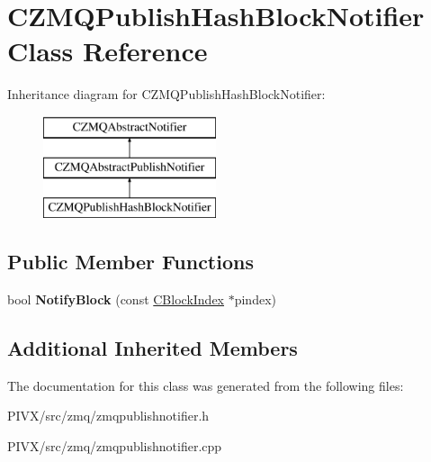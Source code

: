 \hypertarget{class_c_z_m_q_publish_hash_block_notifier}{}\section{C\+Z\+M\+Q\+Publish\+Hash\+Block\+Notifier Class Reference}
\label{class_c_z_m_q_publish_hash_block_notifier}
Inheritance diagram for C\+Z\+M\+Q\+Publish\+Hash\+Block\+Notifier\+:\begin{figure}[H]
\begin{center}
\leavevmode
\includegraphics[height=3.000000cm]{class_c_z_m_q_publish_hash_block_notifier}
\end{center}
\end{figure}
\subsection*{Public Member Functions}
\begin{DoxyCompactItemize}
\item 
\mbox{\label{class_c_z_m_q_publish_hash_block_notifier_ac40147fa0fcbbd7ab755b599b0a9c900}} 
bool {\bfseries Notify\+Block} (const \mbox{\hyperlink{class_c_block_index}{C\+Block\+Index}} $\ast$pindex)
\end{DoxyCompactItemize}
\subsection*{Additional Inherited Members}


The documentation for this class was generated from the following files\+:\begin{DoxyCompactItemize}
\item 
P\+I\+V\+X/src/zmq/zmqpublishnotifier.\+h\item 
P\+I\+V\+X/src/zmq/zmqpublishnotifier.\+cpp\end{DoxyCompactItemize}
